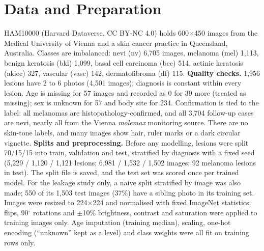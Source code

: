 \documentclass{article}
\begin{document}
\section{Data and Preparation}
HAM10000 (Harvard Dataverse, CC BY-NC 4.0) holds 600$\times$450 images from the Medical University of
Vienna and a skin cancer practice in Queensland, Australia. Classes are imbalanced: nevi (nv) 6{,}705
images, melanoma (mel) 1{,}113, benign keratosis (bkl) 1{,}099, basal cell carcinoma (bcc) 514,
actinic keratosis (akiec) 327, vascular (vasc) 142, dermatofibroma (df) 115.
\textbf{Quality checks.} 1{,}956 lesions have 2 to 6 photos (4{,}501 images); diagnosis is constant
within every lesion. Age is missing for 57 images and recorded as 0 for 39 more (treated as missing);
sex is unknown for 57 and body site for 234. Confirmation is tied to the label: all melanomas are
histopathology-confirmed, and all 3{,}704 follow-up cases are nevi, nearly all from the Vienna
\textit{molemax} monitoring source. There are no skin-tone labels, and many images show hair, ruler
marks or a dark circular vignette.
\textbf{Splits and preprocessing.} Before any modelling, lesions were split 70/15/15 into train,
validation and test, stratified by diagnosis with a fixed seed (5{,}229 / 1{,}120 / 1{,}121 lesions;
6{,}981 / 1{,}532 / 1{,}502 images; 92 melanoma lesions in test). The split file is saved, and the test
set was scored once per trained model. For the leakage study only, a naive split stratified by image
was also made; 550 of its 1{,}503 test images (37\%) have a sibling photo in its training set. Images
were resized to 224$\times$224 and normalised with fixed ImageNet statistics; flips, 90$^\circ$
rotations and $\pm$10\% brightness, contrast and saturation were applied to training images only.
Age imputation (training median), scaling, one-hot encoding (``unknown'' kept as a level) and class
weights were all fit on training rows only.
\end{document}
